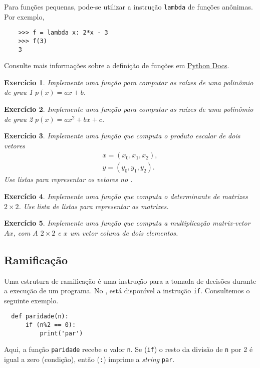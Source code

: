 \documentclass[12pt]{article}
\newtheorem{exr}{Exercício}[section]
\begin{document}
\begin{obs}
  Para funções pequenas, pode-se utilizar a instrução \lstinline+lambda+ de funções anônimas. Por exemplo,
  \begin{lstlisting}
    >>> f = lambda x: 2*x - 3
    >>> f(3)
    3
  \end{lstlisting}
\end{obs}

\begin{obs}
  Consulte mais informações sobre a definição de funções em \href{https://docs.python.org/3/tutorial/controlflow.html#defining-functions}{Python Docs}.
\end{obs}

\begin{exr}
  Implemente uma função para computar as raízes de uma polinômio de grau 1 $p(x) = ax + b$.
\end{exr}

\begin{exr}
  Implemente uma função para computar as raízes de uma polinômio de grau 2 $p(x) = ax^2 + bx + c$.
\end{exr}

\begin{exr}
  Implemente uma função que computa o produto escalar de dois vetores
  \begin{gather}
    x = (x_0, x_1, x_2),\\
    y = (y_0, y_1, y_2).
  \end{gather}
  Use listas para representar os vetores no {\python}.
\end{exr}

\begin{exr}
  Implemente uma função que computa o determinante de matrizes $2\times 2$. Use lista de listas para representar as matrizes.
\end{exr}

\begin{exr}
  Implemente uma função que computa a multiplicação matrix-vetor $Ax$, com $A$ $2\times 2$ e $x$ um vetor coluna de dois elementos.
\end{exr}

\subsection{Ramificação}

Uma estrutura de ramificação é uma instrução para a tomada de decisões durante a execução de um programa. No {\python}, está disponível a instrução \lstinline+if+. Consultemos o seguinte exemplo.
\begin{lstlisting}
  def paridade(n):
      if (n%2 == 0):
          print('par')
\end{lstlisting}
Aqui, a função \lstinline+paridade+ recebe o valor \lstinline+n+. Se (\lstinline+if+) o resto da divisão de \lstinline+n+ por 2 é igual a zero (condição), então (\lstinline+:+) imprime a {\it string} \lstinline+par+.
\end{document}
